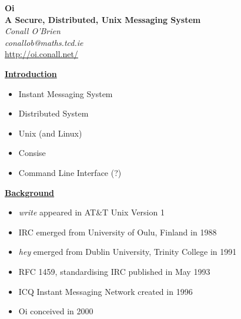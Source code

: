 \documentclass[a4,12pt]{seminar}
\newcommand{\SlideTitle}[1]{\Large \underline{\textbf{#1}}\normalsize}
\begin{document}
\pagestyle{fancy}

\sffamily
\pagecolor{RoyalBlue}
\color{white}

\begin{slide}

\begin{center}
\textbf{
Oi \\ A Secure, Distributed, Unix Messaging System \\ }
\vspace{20mm}
\textit{Conall O'Brien} \\
\vspace{15mm}
\scriptsize{
\textit{conallob@maths.tcd.ie} \\ 
\url{http://oi.conall.net/}
}

\end{center}

\end{slide}


\begin{slide}{\SlideTitle{Introduction}}

\vspace{20mm}

\begin{itemize}

\item Instant Messaging System

\item Distributed System

\item Unix (and Linux)

\item Consise

\item Command Line Interface (?)

\end{itemize} 

\end{slide}


\begin{slide}{\SlideTitle{Background}}

\begin{itemize}

\item \emph{write} appeared in AT\&T Unix Version 1 

\item IRC emerged from University of Oulu, Finland in 1988

\item \emph{hey} emerged from Dublin University, Trinity College in 1991

\item RFC 1459, standardising IRC published in May 1993

\item ICQ Instant Messaging Network created in 1996

\item Oi conceived in 2000

\end{itemize}

\end{slide}
\end{document}
